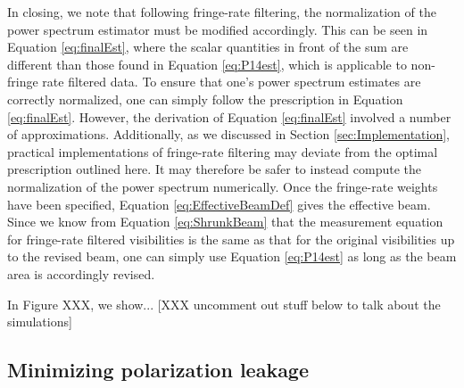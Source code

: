 \documentclass[twocolumn,apj,numberedappendix]{emulateapj}
\begin{document}
In closing, we note that following fringe-rate filtering, the normalization of the power spectrum estimator must be modified accordingly. This can be seen in Equation \eqref{eq:finalEst}, where the scalar quantities in front of the sum are different than those found in Equation \eqref{eq:P14est}, which is applicable to non-fringe rate filtered data. To ensure that one's power spectrum estimates are correctly normalized, one can simply follow the prescription in Equation \eqref{eq:finalEst}. However, the derivation of Equation \eqref{eq:finalEst} involved a number of approximations. Additionally, as we discussed in Section \ref{sec:Implementation}, practical implementations of fringe-rate filtering may deviate from the optimal prescription outlined here. It may therefore be safer to instead compute the normalization of the power spectrum numerically. Once the fringe-rate weights have been specified, Equation \eqref{eq:EffectiveBeamDef} gives the effective beam. Since we know from Equation \eqref{eq:ShrunkBeam} that the measurement equation for fringe-rate filtered visibilities is the same as that for the original visibilities up to the revised beam, one can simply use Equation \eqref{eq:P14est} as long as the beam area is accordingly revised.

In Figure XXX, we show... [XXX uncomment out stuff below to talk about the simulations]
%

\subsection{Minimizing polarization leakage}
\label{sec:polbeams}
\def\VXX{{V_{\rm XX}}}
\def\VYY{{V_{\rm YY}}}
\def\VI{{V_{\rm I}}}
\def\VQ{{V_{\rm Q}}}
\end{document}
